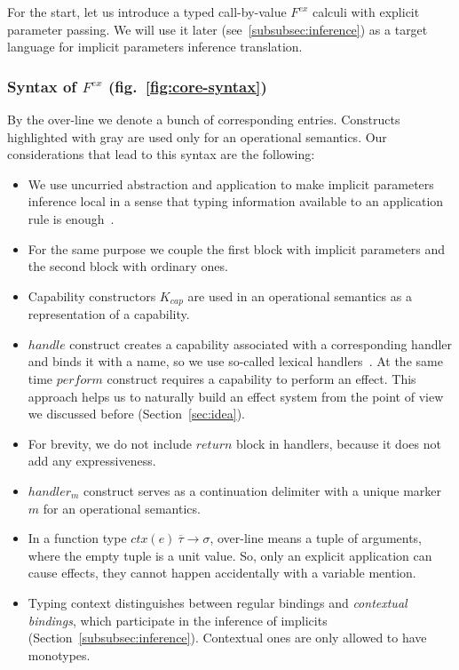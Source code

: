 \documentclass[acmsmall]{acmart}
\newcommand{\ctx}[1]{ctx(#1)~}
\begin{document}
For the start, let us introduce a typed call-by-value $F^{ex}$ calculi with explicit parameter passing.
We will use it later (see\ \ref{subsubsec:inference}) as a target language for implicit parameters inference translation.

\subsubsection{Syntax of $F^{ex}$ (fig.\ \ref{fig:core-syntax})}


By the over-line we denote a bunch of corresponding entries.
Constructs highlighted with gray are used only for an operational semantics.
Our considerations that lead to this syntax are the following:
\begin{itemize}
    \item We use uncurried abstraction and application to make implicit parameters inference local in a sense that typing information available to an application rule is enough~\cite{pierce2000local}.
    \item For the same purpose we couple the first block with implicit parameters and the second block with ordinary ones.
    \item Capability constructors $K_{cap}$ are used in an operational semantics as a representation of a capability. %
    \item $handle$ construct creates a capability associated with a corresponding handler and binds it with a name, so we use so-called lexical handlers~\cite{biernacki2019binders}. %
    At the same time $perform$ construct requires a capability to perform an effect.
    This approach helps us to naturally build an effect system from the point of view we discussed before (Section~\ref{sec:idea}).
    \item For brevity, we do not include $return$ block in handlers, because it does not add any expressiveness.
    \item $handler_m$ construct serves as a continuation delimiter with a unique marker $m$ for an operational semantics.
    \item In a function type $\ctx{e} \overline{\tau} \to \sigma$, over-line means a tuple of arguments, where the empty tuple is a unit value.
    So, only an explicit application can cause effects, they cannot happen accidentally with a variable mention.
    \item Typing context distinguishes between regular bindings and \textit{contextual bindings}, which participate in the inference of implicits (Section\ \ref{subsubsec:inference}).
    Contextual ones are only allowed to have monotypes.
\end{itemize}
\end{document}

